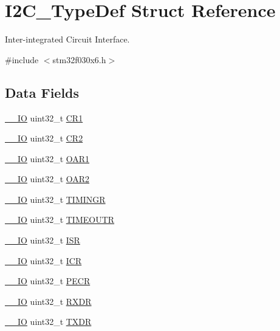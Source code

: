 \hypertarget{struct_i2_c___type_def}{}\section{I2\+C\+\_\+\+Type\+Def Struct Reference}
\label{struct_i2_c___type_def}


Inter-\/integrated Circuit Interface.  




{\ttfamily \#include $<$stm32f030x6.\+h$>$}

\subsection*{Data Fields}
\begin{DoxyCompactItemize}
\item 
\hyperlink{core__sc300_8h_aec43007d9998a0a0e01faede4133d6be}{\+\_\+\+\_\+\+IO} uint32\+\_\+t \hyperlink{struct_i2_c___type_def_ab0ec7102960640751d44e92ddac994f0}{C\+R1}
\item 
\hyperlink{core__sc300_8h_aec43007d9998a0a0e01faede4133d6be}{\+\_\+\+\_\+\+IO} uint32\+\_\+t \hyperlink{struct_i2_c___type_def_afdfa307571967afb1d97943e982b6586}{C\+R2}
\item 
\hyperlink{core__sc300_8h_aec43007d9998a0a0e01faede4133d6be}{\+\_\+\+\_\+\+IO} uint32\+\_\+t \hyperlink{struct_i2_c___type_def_a08b4be0d626a00f26bc295b379b3bba6}{O\+A\+R1}
\item 
\hyperlink{core__sc300_8h_aec43007d9998a0a0e01faede4133d6be}{\+\_\+\+\_\+\+IO} uint32\+\_\+t \hyperlink{struct_i2_c___type_def_ab5c57ffed0351fa064038939a6c0bbf6}{O\+A\+R2}
\item 
\hyperlink{core__sc300_8h_aec43007d9998a0a0e01faede4133d6be}{\+\_\+\+\_\+\+IO} uint32\+\_\+t \hyperlink{struct_i2_c___type_def_a5576a30ffbe0a0800ce7788610327677}{T\+I\+M\+I\+N\+GR}
\item 
\hyperlink{core__sc300_8h_aec43007d9998a0a0e01faede4133d6be}{\+\_\+\+\_\+\+IO} uint32\+\_\+t \hyperlink{struct_i2_c___type_def_a95187d83f061ebbddd8668d0db3fbaa5}{T\+I\+M\+E\+O\+U\+TR}
\item 
\hyperlink{core__sc300_8h_aec43007d9998a0a0e01faede4133d6be}{\+\_\+\+\_\+\+IO} uint32\+\_\+t \hyperlink{struct_i2_c___type_def_ab3c49a96815fcbee63d95e1e74f20e75}{I\+SR}
\item 
\hyperlink{core__sc300_8h_aec43007d9998a0a0e01faede4133d6be}{\+\_\+\+\_\+\+IO} uint32\+\_\+t \hyperlink{struct_i2_c___type_def_a0a8c8230846fd8ff154b9fde8dfa0399}{I\+CR}
\item 
\hyperlink{core__sc300_8h_aec43007d9998a0a0e01faede4133d6be}{\+\_\+\+\_\+\+IO} uint32\+\_\+t \hyperlink{struct_i2_c___type_def_af427631ab4515bb1f16bf5869682c18b}{P\+E\+CR}
\item 
\hyperlink{core__sc300_8h_aec43007d9998a0a0e01faede4133d6be}{\+\_\+\+\_\+\+IO} uint32\+\_\+t \hyperlink{struct_i2_c___type_def_a9bf29a9104cb5569823ab892174f9c8c}{R\+X\+DR}
\item 
\hyperlink{core__sc300_8h_aec43007d9998a0a0e01faede4133d6be}{\+\_\+\+\_\+\+IO} uint32\+\_\+t \hyperlink{struct_i2_c___type_def_ad7e8d785fff2acfeb8814e43bda8dd72}{T\+X\+DR}
\end{DoxyCompactItemize}


